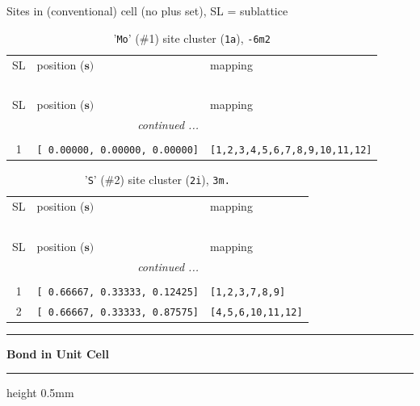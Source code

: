 \documentclass[fleqn,10pt,landscape]{jsarticle}
\begin{document}
\noindent Sites in (conventional) cell (no plus set), SL = sublattice

\renewcommand{\arraystretch}{1.6}
\begin{longtable}[l]{cll}
\captionsetup{justification=raggedright, singlelinecheck=off}
\caption{'\texttt{Mo}' (\#1) site cluster (\texttt{1a}), \texttt{-6m2}}
 \\
 \hline \hline
SL & position ($\bm{s})$ & mapping \\ \hline \endfirsthead

\multicolumn{2}{l}{\tablename\ \thetable{}} \\
 \hline \hline
SL & position ($\bm{s})$ & mapping \\ \hline \endhead

 \hline \hline
\multicolumn{2}{r}{\footnotesize\it continued ...} \\ \endfoot

 \hline \hline
\multicolumn{2}{r}{} \\ \endlastfoot

1 & \texttt{[ 0.00000, 0.00000, 0.00000]} & \texttt{[1,2,3,4,5,6,7,8,9,10,11,12]} \\
\end{longtable}
\renewcommand{\arraystretch}{1.6}
\begin{longtable}[l]{cll}
\captionsetup{justification=raggedright, singlelinecheck=off}
\caption{'\texttt{S}' (\#2) site cluster (\texttt{2i}), \texttt{3m.}}
 \\
 \hline \hline
SL & position ($\bm{s})$ & mapping \\ \hline \endfirsthead

\multicolumn{2}{l}{\tablename\ \thetable{}} \\
 \hline \hline
SL & position ($\bm{s})$ & mapping \\ \hline \endhead

 \hline \hline
\multicolumn{2}{r}{\footnotesize\it continued ...} \\ \endfoot

 \hline \hline
\multicolumn{2}{r}{} \\ \endlastfoot

1 & \texttt{[ 0.66667, 0.33333, 0.12425]} & \texttt{[1,2,3,7,8,9]} \\ \hline
2 & \texttt{[ 0.66667, 0.33333, 0.87575]} & \texttt{[4,5,6,10,11,12]} \\
\end{longtable}
\vspace{5mm}
\noindent \rule[0.5mm]{5mm}{0.5mm}\hspace{3mm}\textbf{Bond in Unit Cell}\hspace{3mm}\leaders\hrule height 0.5mm\hfill\kern0pt
\vspace{3mm}
\end{document}
